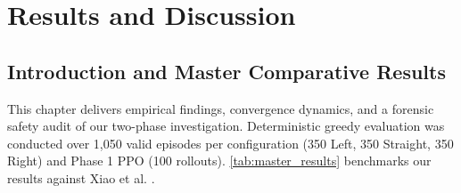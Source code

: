 \chapter{Results and Discussion}
\label{ch:results}

\section{Introduction and Master Comparative Results}
This chapter delivers empirical findings, convergence dynamics, and a forensic safety audit of our two-phase investigation. Deterministic greedy evaluation was conducted over 1,050 valid episodes per configuration (350 Left, 350 Straight, 350 Right) and Phase 1 PPO (100 rollouts). \autoref{tab:master_results} benchmarks our results against Xiao et al. \cite{xiao2024decision}.

